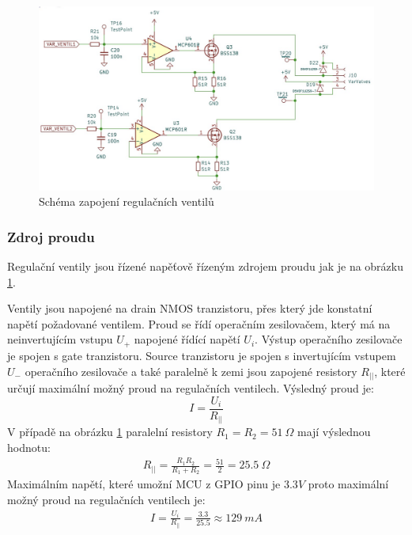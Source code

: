 \begin{figure}[H]
\includegraphics[width=1\linewidth]{pictures/var_valves.jpg}
\caption{Schéma zapojení regulačních ventilů}
\label{fig:variable_valve_driver}
\end{figure}

\subsubsection{Zdroj proudu}
Regulační ventily jsou řízené napěťově řízeným zdrojem proudu jak je na obrázku \ref{fig:variable_valve_driver}.\par
Ventily jsou napojené na drain NMOS tranzistoru, přes který jde konstatní napětí požadované ventilem. Proud se řídí operačním zesilovačem, který má na neinvertujícím vstupu $U_+$ napojené řídící napětí $U_i$. Výstup operačního zesilovače je spojen s gate tranzistoru. Source tranzistoru je spojen s invertujícím vstupem $U_-$ operačního zesilovače a také paralelně k zemi jsou zapojené resistory $R_{||}$, které určují maximální možný proud na regulačních ventilech. Výsledný proud je:
\begin{equation}
    \label{eq:current_source}
    I = \frac{U_i}{R_{||}}
\end{equation}
 V případě na obrázku \ref{fig:variable_valve_driver} paralelní resistory $R_1 = R_2 = 51 \ \Omega$ mají výslednou hodnotu:  
\begin{align*}
    R_{||} = \frac{R_1 R_2}{R_1 + R_2} = \frac{51}{2} = 25.5 \ \Omega
\end{align*}
Maximálním napětí, které umožní MCU z GPIO pinu je $3.3V$ proto maximální možný proud na regulačních ventilech je:
\begin{align*}
    I = \frac{U_i}{R_{||}} = \frac{3.3}{25.5} \approx 129 \ mA
\end{align*}

